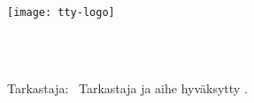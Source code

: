 \makeatletter
\let\thetitle\@title
\let\theauthor\@author
\makeatother

\thispagestyle{empty}

\vspace*{-.5cm}\noindent


\texttt{[image: tty-logo]}

\vspace{6.8cm}

\MakeUppercase{{\large\textbf{\textsf{%
\uppercase{\theauthor} \\
\thetitle \\
}}}}
\textsf{\documenttype}

\vspace{8.7cm} %

\begin{flushright}
\begin{minipage}[c]{6.8cm}
\begin{spacing}{1.0}
\begin{flushleft}
\textsf{\nohyphens{Tarkastaja: \inspector\ Tarkastaja ja aihe hyväksytty \approvaldate.}}
\end{flushleft}
\end{spacing}
\end{minipage}
\end{flushright}

\cleardoublepage
